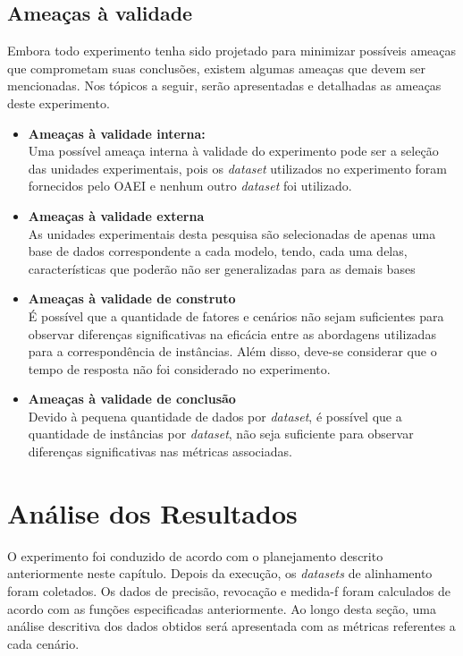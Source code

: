 \subsection{Ameaças à validade}
Embora todo experimento tenha sido projetado para minimizar possíveis ameaças que comprometam suas conclusões, existem algumas ameaças que devem ser mencionadas. Nos tópicos a seguir, serão apresentadas e detalhadas as ameaças deste experimento.
\begin{itemize}
\item \textbf{Ameaças à validade interna:}\\
Uma possível ameaça interna à validade do experimento pode ser a seleção das unidades experimentais, pois os \textit{dataset} utilizados no experimento foram fornecidos pelo OAEI e nenhum outro \textit{dataset} foi utilizado.

\item \textbf{Ameaças à validade externa}\\
As unidades experimentais desta pesquisa são selecionadas de apenas uma base de dados correspondente a cada modelo, tendo, cada uma delas, características que poderão não ser generalizadas para as demais bases

\item \textbf{Ameaças à validade de construto}\\
É possível que a quantidade de fatores e cenários não sejam suficientes para observar diferenças significativas na eficácia entre as abordagens utilizadas para a correspondência de instâncias. Além disso, deve-se considerar que o tempo de resposta não foi considerado no experimento.

\item \textbf{Ameaças à validade de conclusão}\\
Devido à pequena quantidade de dados por \textit{dataset}, é possível que a quantidade de instâncias por \textit{dataset}, não seja suficiente para observar diferenças significativas nas métricas associadas.

\end{itemize}

\section{Análise dos Resultados}
O experimento foi conduzido de acordo com o planejamento descrito anteriormente neste capítulo. Depois da execução, os \textit{datasets} de alinhamento foram coletados. Os dados de precisão, revocação e medida-f foram calculados de acordo com as funções especificadas anteriormente. Ao longo desta seção, uma análise descritiva dos dados obtidos será apresentada com as métricas referentes a cada cenário.

